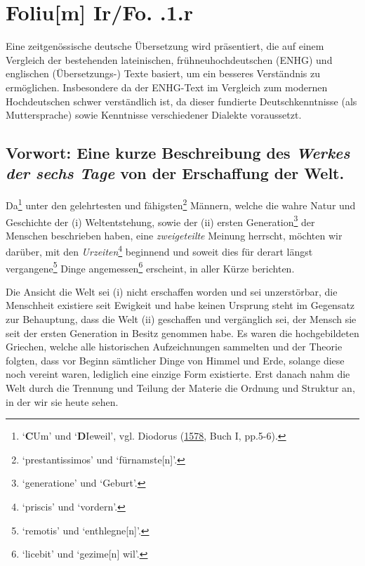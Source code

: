 \documentclass[
]{article}
\author{Dietmar Gerald Schrausser}
\date{09.05.2026}
\begin{document}
\hypertarget{folium-irfo.-.1.r}{%
\section{Foliu{[}m{]} Ir/Fo. .1.r}\label{folium-irfo.-.1.r}}

Eine zeitgenössische deutsche Übersetzung wird präsentiert, die auf
einem Vergleich der bestehenden lateinischen, frühneuhochdeutschen
(ENHG) und englischen (Übersetzungs-) Texte basiert, um ein besseres
Verständnis zu ermöglichen. Insbesondere da der ENHG-Text im Vergleich
zum modernen Hochdeutschen schwer verständlich ist, da dieser fundierte
Deutschkenntnisse (als Muttersprache) sowie Kenntnisse verschiedener
Dialekte voraussetzt.

\hypertarget{vorwort-eine-kurze-beschreibung-des-werkes-der-sechs-tage-von-der-erschaffung-der-welt.}{%
\subsection{\texorpdfstring{Vorwort: Eine kurze Beschreibung des
\emph{Werkes der sechs Tage} von der Erschaffung der
Welt.}{Vorwort: Eine kurze Beschreibung des Werkes der sechs Tage von der Erschaffung der Welt.}}\label{vorwort-eine-kurze-beschreibung-des-werkes-der-sechs-tage-von-der-erschaffung-der-welt.}}

Da\footnote{`\textbf{C}Um' und `\textbf{D}Ieweil', vgl. Diodorus
  (\href{https://doi.org/10.3931/e-rara-35702}{1578}, Buch I, pp.5-6).}
unter den gelehrtesten und fähigsten\footnote{`prestantissimos' und
  `fürnamste{[}n{]}'.} Männern, welche die wahre Natur und Geschichte
der (i) Weltentstehung, sowie der (ii) ersten Generation\footnote{`generatione'
  und `Geburt'.} der Menschen beschrieben haben, eine
\emph{zweigeteilte} Meinung herrscht, möchten wir darüber, mit den
\emph{Urzeiten}\footnote{`priscis' und `vordern'.} beginnend und soweit
dies für derart längst vergangene\footnote{`remotis' und
  `enthlegne{[}n{]}'.} Dinge angemessen\footnote{`licebit' und
  `gezime{[}n{]} wil'.} erscheint, in aller Kürze berichten.

Die Ansicht die Welt sei (i) nicht erschaffen worden und sei
unzerstörbar, die Menschheit existiere seit Ewigkeit und habe keinen
Ursprung steht im Gegensatz zur Behauptung, dass die Welt (ii)
geschaffen und vergänglich sei, der Mensch sie seit der ersten
Generation in Besitz genommen habe. Es waren die hochgebildeten
Griechen, welche alle historischen Aufzeichnungen sammelten und der
Theorie folgten, dass vor Beginn sämtlicher Dinge von Himmel und Erde,
solange diese noch vereint waren, lediglich eine einzige Form
existierte. Erst danach nahm die Welt durch die Trennung und Teilung der
Materie die Ordnung und Struktur an, in der wir sie heute sehen.
\end{document}
